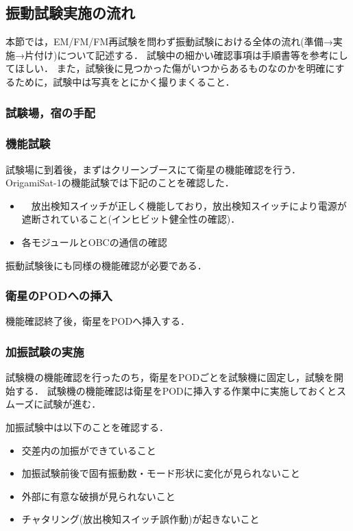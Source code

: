 \subsection{振動試験実施の流れ}
本節では，EM/FM/FM再試験を問わず振動試験における全体の流れ(準備→実施→片付け)について記述する．
試験中の細かい確認事項は手順書\cite{FM_vibration_test_plan}等を参考にしてほしい．
また，試験後に見つかった傷がいつからあるものなのかを明確にするために，試験中は写真をとにかく撮りまくること．

\subsubsection{試験場，宿の手配}


\subsubsection{機能試験}
試験場に到着後，まずはクリーンブースにて衛星の機能確認を行う．
OrigamiSat-1の機能試験では下記のことを確認した．
\begin{itemize}
	\item　放出検知スイッチが正しく機能しており，放出検知スイッチにより電源が遮断されていること(インヒビット健全性の確認)．
	\item 各モジュールとOBCの通信の確認
\end{itemize}
振動試験後にも同様の機能確認が必要である．

\subsubsection{衛星のPODへの挿入}
機能確認終了後，衛星をPODへ挿入する．

\subsubsection{加振試験の実施}
試験機の機能確認を行ったのち，衛星をPODごとを試験機に固定し，試験を開始する．
試験機の機能確認は衛星をPODに挿入する作業中に実施しておくとスムーズに試験が進む．\par

加振試験中は以下のことを確認する．
\begin{itemize}
	\item 交差内の加振ができていること
	\item 加振試験前後で固有振動数・モード形状に変化が見られないこと
	\item 外部に有意な破損が見られないこと
	\item チャタリング(放出検知スイッチ誤作動)が起きないこと
\end{itemize}

